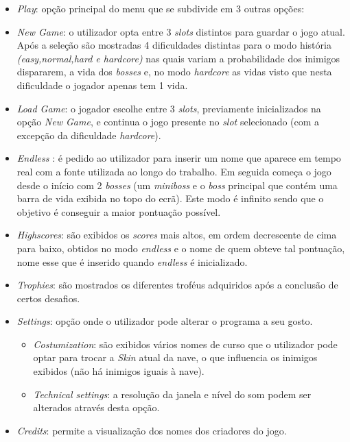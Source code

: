 \documentclass[a4paper,11pt]{article}
\begin{document}
\begin{itemize}
    \item \textit{Play}: opção principal do menu que se subdivide em 3 outras opções:
    \item \textit{New Game}: o utilizador opta entre 3 \textit{slots} distintos para guardar o jogo atual. Após a seleção são mostradas 4 dificuldades distintas para o modo história\textit{ (easy,normal,hard e hardcore)} nas quais variam a probabilidade dos inimigos dispararem, a vida dos \textit{bosses} e, no modo \textit{hardcore} as vidas visto que nesta dificuldade o jogador apenas tem 1 vida.

    \item \textit{Load Game}: o jogador escolhe entre 3 \textit{slots}, previamente inicializados na opção \textit{New Game}, e continua o jogo presente no \textit{slot} selecionado (com a excepção da dificuldade \textit{hardcore}).

    \item   \textit{Endless} : é pedido ao utilizador para inserir um nome que aparece em tempo real com a fonte utilizada ao longo do trabalho. Em seguida começa o jogo desde o início com 2 \textit{bosses} (um \textit{miniboss} e o \textit{boss} principal que contém uma barra de vida exibida no topo do ecrã). Este modo é infinito sendo que o objetivo é conseguir a maior pontuação possível.
    \item  \textit{Highscores}: são exibidos os \textit{scores }mais altos, em ordem decrescente de cima para baixo, obtidos no modo \textit{endless} e o nome de quem obteve tal pontuação, nome esse que é inserido quando \textit{endless} é inicializado.

    \item \textit{Trophies}: são mostrados os diferentes troféus adquiridos após a conclusão de certos desafios.
    \item \textit{Settings}: opção onde o utilizador pode alterar o programa a seu gosto.
          \begin{itemize}
              \item  \textit{Costumization}: são exibidos vários nomes de curso que o utilizador pode optar para trocar a \textit{Skin} atual da nave, o que influencia os inimigos exibidos (não há inimigos iguais à nave).
              \item  \textit{Technical settings}: a resolução da janela e nível do som podem ser alterados através desta opção.
          \end{itemize}
    \item \textit{Credits}: permite a visualização dos nomes dos criadores do jogo.


\end{itemize}
\end{document}
